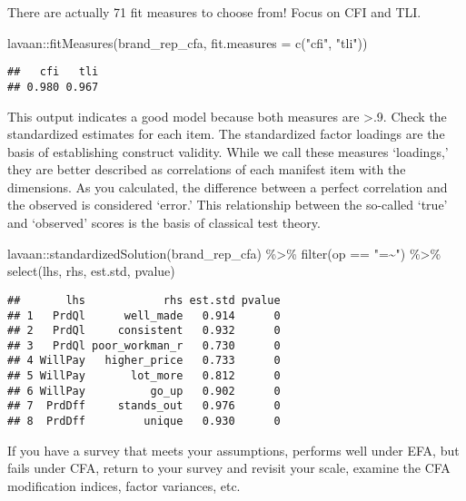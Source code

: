 \documentclass[
]{book}
\newenvironment{Shaded}{\begin{snugshade}}{\end{snugshade}}
\newcommand{\AttributeTok}[1]{\textcolor[rgb]{0.77,0.63,0.00}{#1}}
\newcommand{\FunctionTok}[1]{\textcolor[rgb]{0.00,0.00,0.00}{#1}}
\newcommand{\NormalTok}[1]{#1}
\newcommand{\SpecialCharTok}[1]{\textcolor[rgb]{0.00,0.00,0.00}{#1}}
\newcommand{\StringTok}[1]{\textcolor[rgb]{0.31,0.60,0.02}{#1}}
\theoremstyle{definition}
\theoremstyle{definition}
\theoremstyle{definition}
\theoremstyle{definition}
\theoremstyle{remark}
\begin{document}
There are actually 71 fit measures to choose from! Focus on CFI and TLI.

\begin{Shaded}
\begin{Highlighting}[]
\NormalTok{lavaan}\SpecialCharTok{::}\FunctionTok{fitMeasures}\NormalTok{(brand\_rep\_cfa, }\AttributeTok{fit.measures =} \FunctionTok{c}\NormalTok{(}\StringTok{"cfi"}\NormalTok{, }\StringTok{"tli"}\NormalTok{))}
\end{Highlighting}
\end{Shaded}

\begin{verbatim}
##   cfi   tli 
## 0.980 0.967
\end{verbatim}

This output indicates a good model because both measures are \textgreater.9. Check the standardized estimates for each item. The standardized factor loadings are the basis of establishing construct validity. While we call these measures `loadings,' they are better described as correlations of each manifest item with the dimensions. As you calculated, the difference between a perfect correlation and the observed is considered `error.' This relationship between the so-called `true' and `observed' scores is the basis of classical test theory.

\begin{Shaded}
\begin{Highlighting}[]
\NormalTok{lavaan}\SpecialCharTok{::}\FunctionTok{standardizedSolution}\NormalTok{(brand\_rep\_cfa) }\SpecialCharTok{\%\textgreater{}\%}
  \FunctionTok{filter}\NormalTok{(op }\SpecialCharTok{==} \StringTok{"=\textasciitilde{}"}\NormalTok{) }\SpecialCharTok{\%\textgreater{}\%}
  \FunctionTok{select}\NormalTok{(lhs, rhs, est.std, pvalue)}
\end{Highlighting}
\end{Shaded}

\begin{verbatim}
##       lhs            rhs est.std pvalue
## 1   PrdQl      well_made   0.914      0
## 2   PrdQl     consistent   0.932      0
## 3   PrdQl poor_workman_r   0.730      0
## 4 WillPay   higher_price   0.733      0
## 5 WillPay       lot_more   0.812      0
## 6 WillPay          go_up   0.902      0
## 7  PrdDff     stands_out   0.976      0
## 8  PrdDff         unique   0.930      0
\end{verbatim}

If you have a survey that meets your assumptions, performs well under EFA, but fails under CFA, return to your survey and revisit your scale, examine the CFA modification indices, factor variances, etc.
\end{document}
